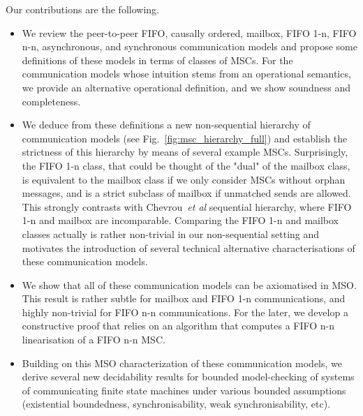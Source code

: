 Our contributions are the following.

\begin{itemize}
	\item We review the peer-to-peer FIFO, causally ordered, mailbox, FIFO 1-n, FIFO n-n, asynchronous, and synchronous communication models
	and propose some definitions of these models in terms of classes of MSCs. For the communication models whose intuition stems from
	an operational semantics, we provide an alternative operational definition, and we show soundness and completeness.

	\item We deduce from these definitions a new non-sequential hierarchy of communication models (see Fig.~\ref{fig:msc_hierarchy_full})
	and establish the strictness of this hierarchy by means of several example MSCs.
	Surprisingly, the FIFO 1-n class, that could be thought of the "dual" of the mailbox class, is equivalent to the mailbox class if
	we only consider MSCs without orphan messages, and is a strict subclass of mailbox if unmatched sends are allowed. This strongly
	contrasts with Chevrou~\emph{et al} sequential hierarchy, where FIFO 1-n and mailbox are incomparable. Comparing
	the FIFO 1-n and mailbox classes actually is rather non-trivial in our non-sequential setting and motivates the introduction
	of several technical alternative characterisations of these communication models.

	\item We show that all of these communication models can be axiomatised in MSO. This result is rather subtle for mailbox and FIFO 1-n communications, and highly non-trivial for FIFO n-n communications. For the later, we develop a constructive proof that relies on an
	algorithm that computes a FIFO n-n linearisation of a FIFO n-n MSC.

	\item Building on this MSO characterization of these communication models, we derive several new decidability results for bounded
	model-checking of systems of communicating finite state machines under various bounded assumptions (existential boundedness, synchronisability, weak synchronisability, etc).
\end{itemize}


